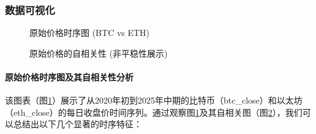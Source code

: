 \documentclass[a4paper]{ctexart}
\begin{document}
	\subsubsection{数据可视化}
	
	\begin{figure}[htbp]
		\centering
		\caption{原始价格时序图 (BTC vs ETH)}
		\label{fig:price_timeseries}
	\end{figure}
	
	\begin{figure}[htbp]
		\centering
		\caption{原始价格的自相关性 (非平稳性展示)}
		\label{fig:price_acf}
	\end{figure}
	
	\paragraph{原始价格时序图及其自相关性分析}
	该图表（图\ref{fig:price_timeseries}）展示了从2020年初到2025年中期的比特币（btc\_close）和以太坊（eth\_close）的每日收盘价时间序列。通过观察图\ref{fig:price_timeseries}及其自相关图（图\ref{fig:price_acf}），我们可以总结出以下几个显著的时序特征：
	
\end{document}

